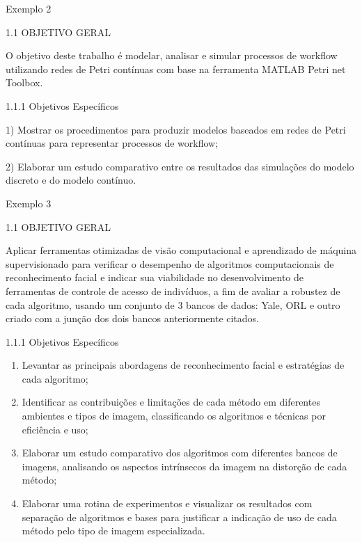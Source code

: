 
                 

Exemplo 2 \\



\begin{mdframed}
	
1.1 OBJETIVO GERAL

O objetivo deste trabalho é modelar, analisar e simular processos de workflow utilizando redes de Petri contínuas com base na ferramenta MATLAB Petri net Toolbox. 

1.1.1 Objetivos Específicos

1)	Mostrar os procedimentos para produzir modelos baseados em redes de Petri contínuas para representar processos de workflow; 

2)	Elaborar um estudo comparativo entre os resultados das simulações do modelo discreto e do modelo contínuo. \linebreak

\end{mdframed}


Exemplo 3  \\



\begin{mdframed}
	
1.1 OBJETIVO GERAL

Aplicar ferramentas otimizadas de visão computacional e aprendizado de máquina supervisionado para verificar o desempenho de algoritmos computacionais de reconhecimento facial e indicar sua viabilidade no desenvolvimento de ferramentas de controle de acesso de indivíduos, a fim de avaliar a robustez de cada algoritmo, usando um conjunto de 3 bancos de dados: Yale, ORL e outro criado com a junção dos dois bancos anteriormente citados.

1.1.1 Objetivos Específicos
\begin{enumerate}
	\item Levantar as principais abordagens de reconhecimento facial e estratégias de cada algoritmo; 
	
	\item Identificar as contribuições e limitações de cada método em diferentes ambientes e tipos de imagem, classificando os algoritmos e técnicas por eficiência e uso;
	
	\item Elaborar um estudo comparativo dos algoritmos com diferentes bancos de imagens, analisando os aspectos intrínsecos da imagem na distorção de cada método;
	
	\item Elaborar uma rotina de experimentos e visualizar os resultados com separação de algoritmos e bases para justificar a indicação de uso de cada método pelo tipo de imagem especializada.\linebreak
	
\end{enumerate}

\end{mdframed}

